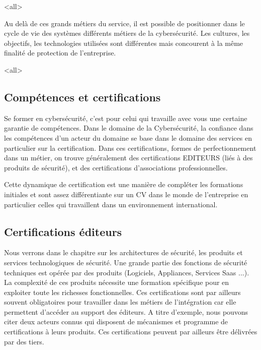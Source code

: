 \mode<all>{}

Au delà de ces grands métiers du service, il est possible de positionner dans le cycle de vie des systèmes différents métiers de la cybersécurité. Les cultures, les objectifs, les technologies utilisées sont différentes mais concourent à la même finalité de protection de l'entreprise.

\mode<all>{}


\subsection{Compétences et certifications}

Se former en cybersécurité, c'est pour celui qui travaille avec vous une certaine garantie de compétences. Dans le domaine de la Cybersécurité, la confiance dans les compétences d'un acteur du domaine se base dans le domaine des services en particulier sur la certification. Dans ces certifications, formes de perfectionnement dans un métier, on trouve généralement des  certifications EDITEURS (liés à des produits de sécurité), et des certifications d'associations professionnelles. 

Cette dynamique de certification est une manière de compléter les formations initiales et sont  assez différentiante sur un CV dans le monde de l'entreprise en particulier celles qui travaillent dans un environnement international.


\subsection{Certifications éditeurs}

Nous verrons dans le chapitre sur les architectures de sécurité, les produits et services technologiques de sécurité. Une grande partie des fonctions de sécurité techniques est opérée par des produits (Logiciels, Appliances, Services Saas ...). La complexité de ces produits nécessite une formation spécifique pour en exploiter toute les richesses fonctionnelles.
Ces certifications sont par ailleurs souvent obligatoires pour travailler dans les métiers de l'intégration car elle permettent d'accéder au support des éditeurs. A titre d'exemple, nous pouvons citer deux acteurs connus qui disposent de mécanismes et programme de certifications à leurs produits. Ces certifications peuvent par ailleurs être délivrées par des tiers.

